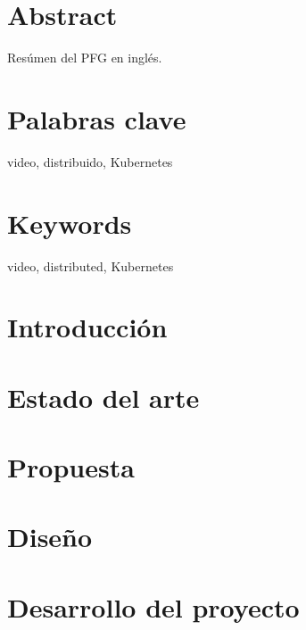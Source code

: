 \documentclass[12pt]{book}
\newcommand\paginablanco{%
    \null
    \thispagestyle{empty}%
    \newpage}
\begin{document}
\chapter*{Abstract} %

Resúmen del PFG en inglés.

\chapter*{Palabras clave} %

video, distribuido, Kubernetes 

\chapter*{Keywords} %

video, distributed, Kubernetes

\tableofcontents %
\listoftables    %
\listoffigures   %
\newpage

\paginablanco{}


\chapter{Introducción}


\chapter{Estado del arte}

\chapter{Propuesta}

\chapter{Diseño}

\chapter{Desarrollo del proyecto}

\end{document}

